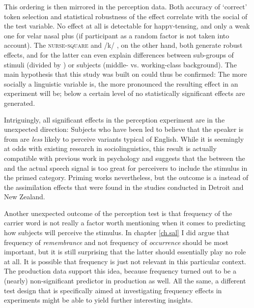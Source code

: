 This ordering is then mirrored in the perception data.
Both accuracy of `correct' token selection and statistical robustness of the  effect correlate with the social  of the test variable.
No effect at all is detectable for happ\textsc{y}-tensing, and only a weak one for velar nasal plus (if participant as a random factor is not taken into account).
The \textsc{nurse}-\textsc{square}  and /k/ , on the other hand, both generate robust  effects, and for the latter  can even explain differences between sub-groups of stimuli (divided by ) or subjects (middle- vs. working-class background).
The main hypothesis that this study was built on could thus be confirmed: The more socially  a linguistic variable is, the more pronounced the resulting effect in an   experiment will be; below a certain level of  no statistically significant  effects are generated.

Intriguingly, all significant effects in the perception experiment are in the unexpected direction: Subjects who have been led to believe that the speaker is from  are \emph{less} likely to perceive variants typical of  English.
While it is seemingly at odds with existing  research in sociolinguistics, this result is actually compatible with previous work in psychology and suggests that the  between the  and the actual speech signal is too great for perceivers to include the stimulus in the primed category.
Priming works nevertheless, but the outcome is a  instead of the assimilation effects that were found in the studies conducted in Detroit and New Zealand.

Another unexpected outcome of the perception test is that frequency of the carrier word is not really a factor worth mentioning when it comes to predicting how subjects will perceive the stimulus.
In chapter \ref{ch.sal} I did argue that frequency of \emph{remembrance} and not frequency of \emph{occurrence} should be most important, but it is still surprising that the latter should essentially play no role at all.
It is possible that frequency is just not relevant in this particular context.
The production data support this idea, because frequency turned out to be a (nearly) non-significant predictor in production as well.
All the same, a different test design that is specifically aimed at investigating frequency effects in  experiments might be able to yield further interesting insights.

